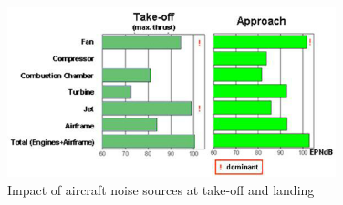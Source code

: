 \begin{figure}[h!]
\centering %
\includegraphics[width=0.85\textwidth]{Pictures/traub2.png}
\caption{Impact of aircraft noise sources at take-off and landing \citep{traub}}
\label{traub2}
\end{figure}
